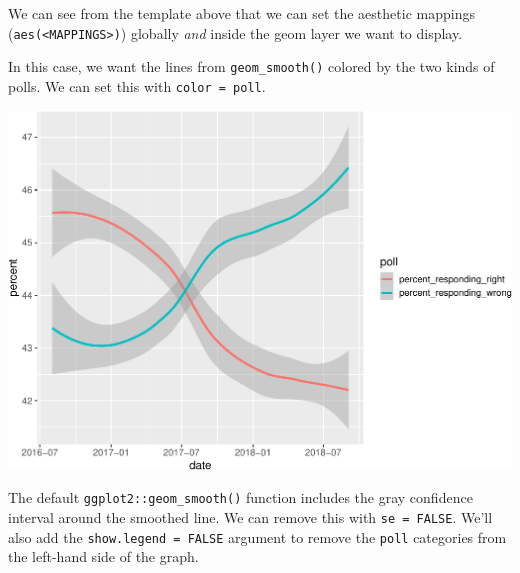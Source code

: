 \documentclass[letterpaper,12pt,twoside,]{pinp}
\begin{document}
We can see from the template above that we can set the aesthetic
mappings (\texttt{aes(\textless{}MAPPINGS\textgreater{})}) globally
\emph{and} inside the geom layer we want to display.

In this case, we want the lines from \texttt{geom\_smooth()} colored by
the two kinds of polls. We can set this with \texttt{color\ =\ poll}.

\begin{Shaded}
\begin{Highlighting}[]
\SpecialCharTok{+} 
\SpecialCharTok{::}\NormalTok{(}\NormalTok{(}
\end{Highlighting}
\end{Shaded}

\begin{center}\includegraphics{03-intro-to-ggplot2_files/figure-latex/color-poll-1} \end{center}

The default \texttt{ggplot2::geom\_smooth()} function includes the gray
confidence interval around the smoothed line. We can remove this with
\texttt{se\ =\ FALSE}. We'll also add the \texttt{show.legend\ =\ FALSE}
argument to remove the \texttt{poll} categories from the left-hand side
of the graph.

\begin{Shaded}
\begin{Highlighting}[]
\OtherTok{\textless{}{-}}\SpecialCharTok{+} 
  \NormalTok{(}\NormalTok{(} \NormalTok{, } \NormalTok{)}
\end{Highlighting}
\end{Shaded}
\end{document}
